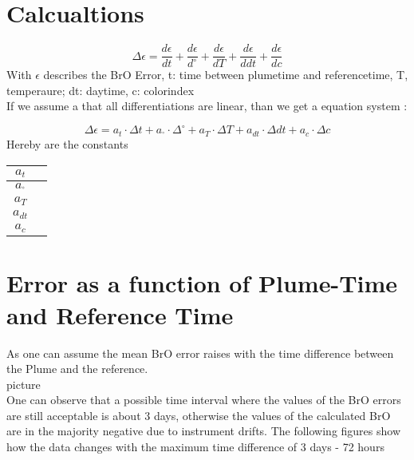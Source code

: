 \documentclass[]{article}
\begin{document}
\section{Calcualtions}

\begin{equation}
\Delta \epsilon = \frac{d\epsilon}{dt}+\frac{d\epsilon}{d ^{\circ}}+\frac{d\epsilon}{dT}+\frac{d\epsilon}{ddt} +\frac{d\epsilon}{dc}
\end{equation}
With $\epsilon$ describes the BrO Error, t: time between plumetime and referencetime, T, temperaure; dt: daytime, c: colorindex\\
If we assume a that all differentiations are linear, than we get a 
equation system :

\begin{equation}
\Delta \epsilon = a_{t}\cdot\Delta t+a_{^{\circ}}\cdot\Delta ^{\circ}+a_{T}\cdot\Delta T+a_{dt}\cdot\Delta dt +a_{c}\cdot\Delta c
\end{equation}
Hereby are the constants 
\begin{table}[h]
\begin{tabular}{c|c}
\toprule
$a_{t}$&\\
\midrule
$a_{^{\circ}}$&\\
\midrule
$a_{T}$&\\
\midrule
$a_{dt}$&\\
\midrule
$a_{c}$&\\
\bottomrule
\end{tabular}
\end{table}
\section{Error as a function of Plume-Time and Reference Time}
As one can assume the mean BrO error raises with the time difference between the Plume and the reference. 
\\
picture
\\
One can observe that a possible time interval where the values of the BrO errors are still acceptable is about 3 days, otherwise the values of the calculated BrO are
in the majority negative due to instrument drifts. The following figures show how the data changes with the maximum time difference of 3 days - 72 hours
\end{document}
